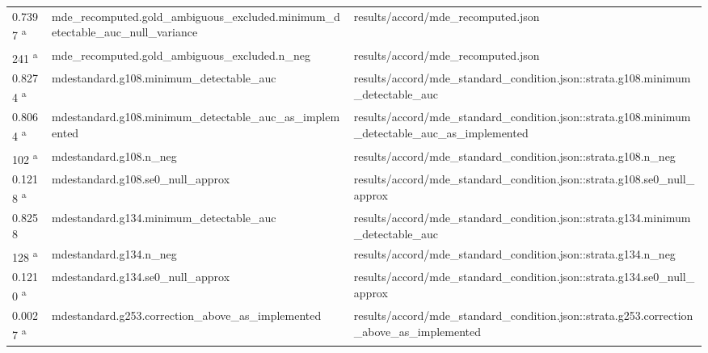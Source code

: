 \begin{longtable}{@{}p{0.7in}p{1.9in}p{2.6in}@{}}
0.7397 \textsuperscript{a} & mde\_recomputed.\allowbreak{}gold\_ambiguous\_excluded.\allowbreak{}minimum\_detectable\_auc\_null\_variance & results/\allowbreak{}accord/\allowbreak{}mde\_recomputed.\allowbreak{}json\\
241 \textsuperscript{a} & mde\_recomputed.\allowbreak{}gold\_ambiguous\_excluded.\allowbreak{}n\_neg & results/\allowbreak{}accord/\allowbreak{}mde\_recomputed.\allowbreak{}json\\
0.8274 \textsuperscript{a} & mdestandard.\allowbreak{}g108.\allowbreak{}minimum\_detectable\_auc & results/\allowbreak{}accord/\allowbreak{}mde\_standard\_condition.\allowbreak{}json::strata.\allowbreak{}g108.\allowbreak{}minimum\_detectable\_auc\\
0.8064 \textsuperscript{a} & mdestandard.\allowbreak{}g108.\allowbreak{}minimum\_detectable\_auc\_as\_implemented & results/\allowbreak{}accord/\allowbreak{}mde\_standard\_condition.\allowbreak{}json::strata.\allowbreak{}g108.\allowbreak{}minimum\_detectable\_auc\_as\_implemented\\
102 \textsuperscript{a} & mdestandard.\allowbreak{}g108.\allowbreak{}n\_neg & results/\allowbreak{}accord/\allowbreak{}mde\_standard\_condition.\allowbreak{}json::strata.\allowbreak{}g108.\allowbreak{}n\_neg\\
0.1218 \textsuperscript{a} & mdestandard.\allowbreak{}g108.\allowbreak{}se0\_null\_approx & results/\allowbreak{}accord/\allowbreak{}mde\_standard\_condition.\allowbreak{}json::strata.\allowbreak{}g108.\allowbreak{}se0\_null\_approx\\
0.8258 & mdestandard.\allowbreak{}g134.\allowbreak{}minimum\_detectable\_auc & results/\allowbreak{}accord/\allowbreak{}mde\_standard\_condition.\allowbreak{}json::strata.\allowbreak{}g134.\allowbreak{}minimum\_detectable\_auc\\
128 \textsuperscript{a} & mdestandard.\allowbreak{}g134.\allowbreak{}n\_neg & results/\allowbreak{}accord/\allowbreak{}mde\_standard\_condition.\allowbreak{}json::strata.\allowbreak{}g134.\allowbreak{}n\_neg\\
0.1210 \textsuperscript{a} & mdestandard.\allowbreak{}g134.\allowbreak{}se0\_null\_approx & results/\allowbreak{}accord/\allowbreak{}mde\_standard\_condition.\allowbreak{}json::strata.\allowbreak{}g134.\allowbreak{}se0\_null\_approx\\
0.0027 \textsuperscript{a} & mdestandard.\allowbreak{}g253.\allowbreak{}correction\_above\_as\_implemented & results/\allowbreak{}accord/\allowbreak{}mde\_standard\_condition.\allowbreak{}json::strata.\allowbreak{}g253.\allowbreak{}correction\_above\_as\_implemented\\

\end{longtable}
